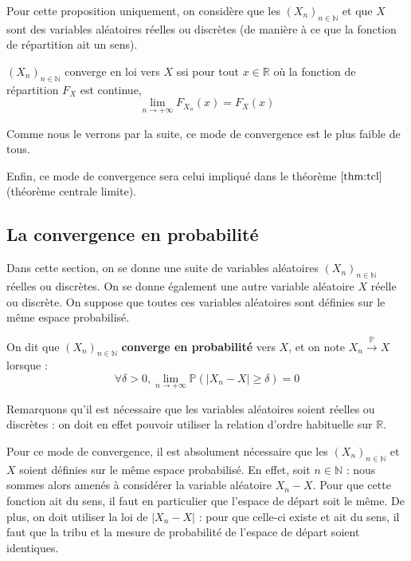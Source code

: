 \documentclass[../integ-proba.tex]{subfiles}
\begin{document}
    Pour cette proposition uniquement, on considère que les $\left(X_n\right)_{n\in\mathbb{N}}$ et que $X$ sont des variables aléatoires réelles ou discrètes (de manière à ce que la fonction de répartition ait un sens).

    \begin{prop}
        $\left(X_n\right)_{n\in\mathbb{N}}$ converge en loi vers $X$ ssi pour tout $x \in \mathbb{R}$ où la fonction de répartition $F_X$ est continue,
        $$
        \lim_{n \to +\infty} F_{X_n}(x) = F_X(x)
        $$
    \end{prop}

    \begin{rem}
        Comme nous le verrons par la suite, ce mode de convergence est le plus faible de tous.
    \end{rem}

    \begin{rem}
        Enfin, ce mode de convergence sera celui impliqué dans le théorème $\ref{thm:tcl}$ (théorème centrale limite).
    \end{rem}

    \subsection{La convergence en probabilité}

    Dans cette section, on se donne une suite de variables aléatoires $\left(X_n\right)_{n\in\mathbb{N}}$ réelles ou discrètes.
    On se donne également une autre variable aléatoire $X$ réelle ou discrète.
    On suppose que toutes ces variables aléatoires sont définies sur le même espace probabilisé.

    \begin{defi}
        On dit que $\left(X_n\right)_{n\in\mathbb{N}}$ \textbf{converge en probabilité} vers $X$, et on note $X_n \xrightarrow[]{\mathbb{P}} X$ lorsque :
        $$
        \forall \delta > 0, \lim_{n \to +\infty} \mathbb{P}\left(\left|X_n - X\right| \geq \delta\right) = 0
        $$
    \end{defi}

    \begin{rem}
        Remarquons qu'il est nécessaire que les variables aléatoires soient réelles ou discrètes : on doit en effet pouvoir utiliser la relation d'ordre habituelle sur $\mathbb{R}$.
    \end{rem}

    \begin{rem}
        Pour ce mode de convergence, il est absolument nécessaire que les $\left(X_n\right)_{n\in\mathbb{N}}$ et $X$ soient définies sur le même espace probabilisé.
        En effet, soit $n \in \mathbb{N}$ : nous sommes alors amenés à considérer la variable aléatoire $X_n - X$.
        Pour que cette fonction ait du sens, il faut en particulier que l'espace de départ soit le même.
        De plus, on doit utiliser la loi de $\left|X_n - X\right|$ : pour que celle-ci existe et ait du sens, il faut que la tribu et la mesure de probabilité de l'espace de départ soient identiques.
    \end{rem}
\end{document}
